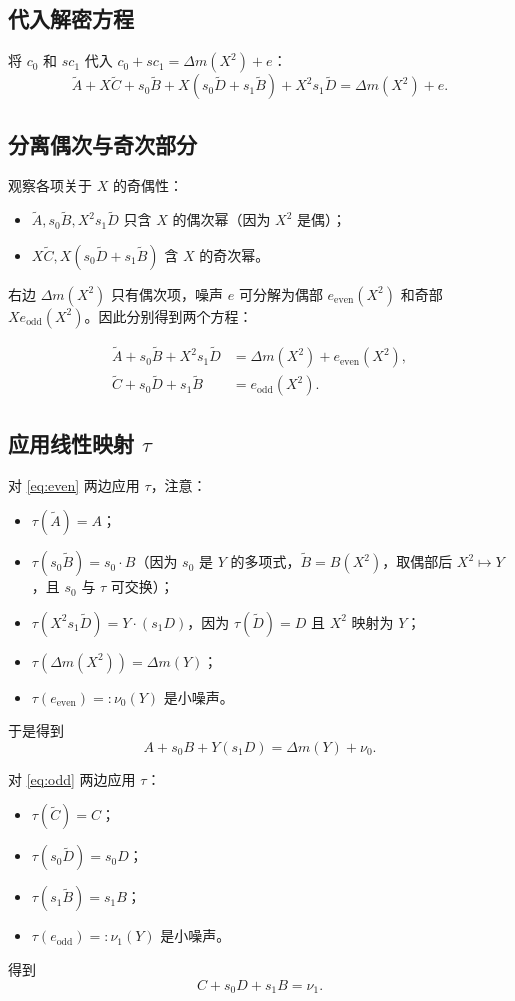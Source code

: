 \documentclass{article}
\begin{document}
\subsection{代入解密方程}
将 $c_0$ 和 $s c_1$ 代入 $c_0 + s c_1 = \Delta m(X^2) + e$：
\[
\tilde{A} + X\tilde{C} + s_0\tilde{B} + X(s_0\tilde{D} + s_1\tilde{B}) + X^2 s_1\tilde{D}
= \Delta m(X^2) + e.
\]

\subsection{分离偶次与奇次部分}
观察各项关于 $X$ 的奇偶性：
\begin{itemize}
\item $\tilde{A}, s_0\tilde{B}, X^2 s_1\tilde{D}$ 只含 $X$ 的偶次幂（因为 $X^2$ 是偶）；
\item $X\tilde{C}, X(s_0\tilde{D} + s_1\tilde{B})$ 含 $X$ 的奇次幂。
\end{itemize}
右边 $\Delta m(X^2)$ 只有偶次项，噪声 $e$ 可分解为偶部 $e_{\text{even}}(X^2)$ 和奇部 $X e_{\text{odd}}(X^2)$。因此分别得到两个方程：

\begin{align}
\tilde{A} + s_0\tilde{B} + X^2 s_1\tilde{D} &= \Delta m(X^2) + e_{\text{even}}(X^2), \label{eq:even} \\
\tilde{C} + s_0\tilde{D} + s_1\tilde{B} &= e_{\text{odd}}(X^2). \label{eq:odd}
\end{align}

\subsection{应用线性映射 $\tau$}
对 \eqref{eq:even} 两边应用 $\tau$，注意：
\begin{itemize}
\item $\tau(\tilde{A}) = A$；
\item $\tau(s_0\tilde{B}) = s_0 \cdot B$（因为 $s_0$ 是 $Y$ 的多项式，$\tilde{B}=B(X^2)$，取偶部后 $X^2 \mapsto Y$，且 $s_0$ 与 $\tau$ 可交换）；
\item $\tau(X^2 s_1\tilde{D}) = Y \cdot (s_1 D)$，因为 $\tau(\tilde{D})=D$ 且 $X^2$ 映射为 $Y$；
\item $\tau(\Delta m(X^2)) = \Delta m(Y)$；
\item $\tau(e_{\text{even}}) =: \nu_0(Y)$ 是小噪声。
\end{itemize}
于是得到
\[
A + s_0 B + Y (s_1 D) = \Delta m(Y) + \nu_0. \tag{1}
\]

对 \eqref{eq:odd} 两边应用 $\tau$：
\begin{itemize}
\item $\tau(\tilde{C}) = C$；
\item $\tau(s_0\tilde{D}) = s_0 D$；
\item $\tau(s_1\tilde{B}) = s_1 B$；
\item $\tau(e_{\text{odd}}) =: \nu_1(Y)$ 是小噪声。
\end{itemize}
得到
\[
C + s_0 D + s_1 B = \nu_1. \tag{2}
\]
\end{document}
